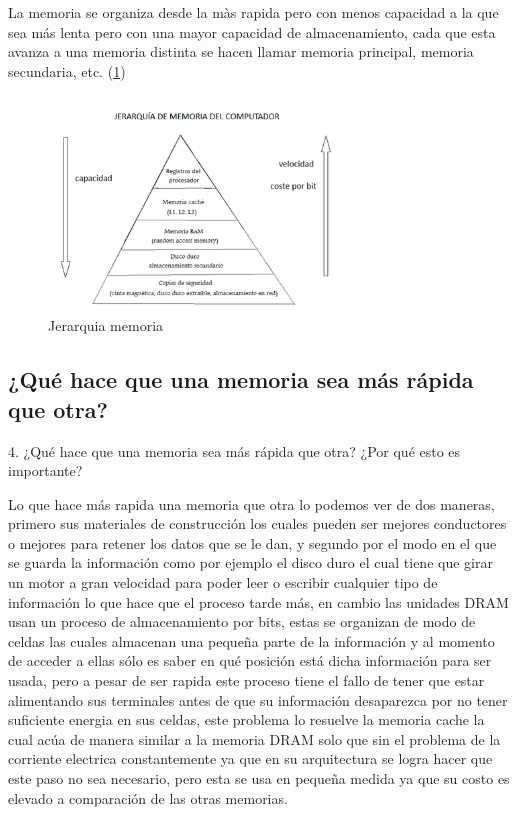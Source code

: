 \documentclass{article}
\begin{document}
\vspace{6.5cm}
La memoria se organiza desde la màs rapida pero con menos capacidad a la que sea más lenta pero con una mayor capacidad de almacenamiento, cada que esta avanza a una memoria distinta se hacen llamar memoria principal, memoria secundaria, etc.
(\ref{fig:cpplogo})

\begin{figure}[h]
\includegraphics[width=8cm]{Jerarquia de la memoria.png}
\centering
\caption{Jerarquia memoria}
\label{fig:cpplogo}
\end{figure}

\subsection{¿Qué hace que una memoria sea más rápida que otra?}
4. ¿Qué hace que una memoria sea más rápida que otra? ¿Por qué esto es importante?\vspace{0.5cm}




Lo que hace más rapida una memoria que otra lo podemos ver de dos maneras, primero sus materiales de construcción los cuales pueden ser mejores conductores o mejores para retener  los datos que se le dan, y segundo por el modo en el que se guarda la información como por ejemplo el disco duro el cual tiene que girar un motor a gran velocidad para poder leer o escribir cualquier tipo de información lo que hace que el proceso tarde más, en cambio las unidades DRAM usan un proceso de almacenamiento por bits, estas se organizan de modo de celdas las cuales almacenan una pequeña parte de la información y al momento de acceder a ellas sólo es saber en qué posición está dicha información para ser usada, pero a pesar de ser rapida este proceso tiene el fallo de tener que estar alimentando sus terminales antes de que su información desaparezca por no tener suficiente energia en sus celdas, este problema lo resuelve la memoria cache la cual acúa de manera similar a la memoria DRAM solo que sin el problema de la corriente electrica constantemente ya que en su arquitectura se logra hacer que este paso no sea necesario, pero esta se usa en pequeña medida ya que su costo es elevado a comparación de las otras memorias.
\end{document}
